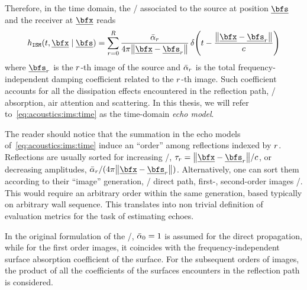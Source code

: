 Therefore, in the time domain, the \RIR/ associated to the source at position $\positionSource$ and the receiver at $\positionMicrophone$ reads
\begin{equation}\label{eq:acoustics:ims:time}
    \rir_{\mathtt{ISM}}(t, \positionMicrophone \mid \positionSource) =
    \sum_{\idxEch=0}^{\numEchs}
        \frac{\bar{\absCoeff}_{\idxEch}}{4 \pi \norm{\positionMicrophone - \positionSource_\idxEch}}
        \diracOf{t - \frac{\norm{\positionMicrophone - \positionSource_\idxEch}}{\speedOfSound}}
\end{equation}
where $\positionSource_\idxEch$ is the $r$-th image of the source and $\bar{\alpha}_{r}$ is the total frequency-independent damping coefficient related to the $r$-th image.
Such coefficient accounts for all the dissipation effects encountered in the reflection path, \eg/ absorption, air attention and scattering.
In this thesis, we will refer to~\cref{eq:acoustics:ims:time} as the time-domain \textit{echo model}.

\mynewline
The reader should notice that the summation in the echo models of~\cref{eq:acoustics:ims:time} induce an ``order'' among reflections indexed by $r$.
Reflections are usually sorted for increasing \TOA/, $\tau_r = \norm{\positionMicrophone - \positionSource_\idxEch}/\speedOfSound$,
or decreasing amplitudes, $\bar{\absCoeff}_{\idxEch}/(4 \pi \norm{\positionMicrophone - \positionSource_\idxEch})$.
Alternatively, one can sort them according to their ``image'' generation, \eg/ direct path, first-, second-order images \etc/.
This would require an arbitrary order within the same generation, based typically on arbitrary wall sequence.
This translates into non trivial definition of evaluation metrics for the task of estimating echoes.

\mynewline
In the original formulation of the \ISM/, $\bar{\alpha}_{0} = 1$ is assumed for the direct propagation,
while for the first order images, it coincides with the frequency-independent surface absorption coefficient of the surface.
For the subsequent orders of images, the product of all the coefficients of the surfaces encounters in the reflection path is considered.

